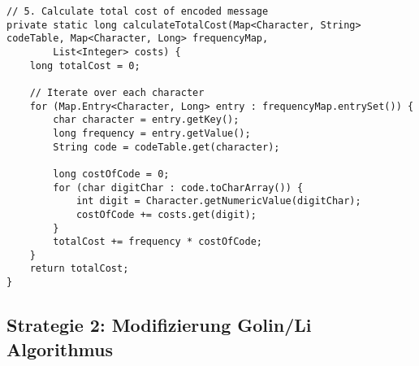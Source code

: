 \documentclass[a4paper,10pt,ngerman]{scrartcl}
\begin{document}
\begin{lstlisting}
// 5. Calculate total cost of encoded message
private static long calculateTotalCost(Map<Character, String> codeTable, Map<Character, Long> frequencyMap,
        List<Integer> costs) {
    long totalCost = 0;

    // Iterate over each character
    for (Map.Entry<Character, Long> entry : frequencyMap.entrySet()) {
        char character = entry.getKey();
        long frequency = entry.getValue();
        String code = codeTable.get(character);

        long costOfCode = 0;
        for (char digitChar : code.toCharArray()) {
            int digit = Character.getNumericValue(digitChar);
            costOfCode += costs.get(digit);
        }
        totalCost += frequency * costOfCode;
    }
    return totalCost;
}
\end{lstlisting}

\subsection{Strategie 2: Modifizierung Golin/Li Algorithmus}
\end{document}
